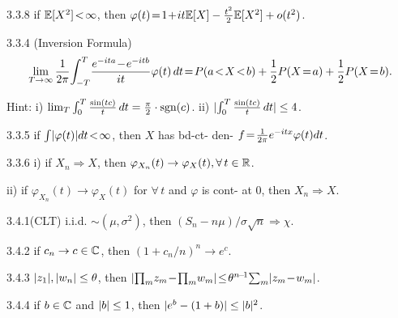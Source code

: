 \vspace{-1ex}

\begin{thm}{3.3.8}
    if $\mathbb{E}[X^2] \!<\! \infty$, then $\varphi(t) \!=\! 1 \!+\! it \mathbb{E}[X] - \frac{t^2}{2} \mathbb{E}[X^2] + o(t^2)$.
\end{thm}

\begin{thm}{3.3.4} (Inversion Formula) 
    \[ \lim_{T \rightarrow \infty} \frac{1}{2\pi} \! \int_{-T}^{T} \! \frac{e^{-ita} \tm e^{-itb}}{it} \varphi(t) \, dt \teq \prob{a \tl X \tl b} + \frac{1}{2} \prob{X \teq a} + \frac{1}{2} \prob{X \teq b}.\]
    
    \vspace{-1ex}
    Hint: i) $\lim_T \int_0^T \frac{\sin(tc)}{t} \, dt = \frac{\pi}{2} \cdot \text{sgn}(c)$. ii) $\lvert \int_0^T \frac{\sin(tc)}{t} \, dt \rvert \leq 4$.
\end{thm}

\begin{thm}{3.3.5}
    if $\int \lvert \varphi(t) \rvert dt \!<\! \infty$, then $X$ has bd-ct- den- $f \!=\! \frac{1}{2\pi} e^{-itx} \varphi(t) dt$.
\end{thm}

\begin{thm}{3.3.6}
    i) if $X_n \Rightarrow X$, then $\varphi_{X_n}(t) \rightarrow \varphi_X(t), \forall\, t\in \mathbb{R}$.
    
    ii) if $\varphi_{X_n}(t) \rightarrow \varphi_X(t)$ for $\forall\, t$ and $\varphi$ is cont- at $0$, then $X_n \Rightarrow X$. 
\end{thm}

\begin{thm}{3.4.1}(CLT)
    i.i.d. $\sim (\mu, \sigma^2)$, then $(S_n - n\mu) / \sigma\sqrt{n} \Rightarrow \chi$.
\end{thm}

\begin{thm}{3.4.2}
     if $c_n \rightarrow c \in \mathbb{C}$, then $(1 + c_n/n)^n \rightarrow e^c$.
\end{thm}

\begin{lem}{3.4.3}
    $\lvert z_1 \rvert, \lvert w_n \rvert \leq \theta$, then $\abs{\prod_m \! z_m \tm \prod_m \! w_m} \tleq \theta^{n \tm 1}\!\sum_m \abs{z_m \tm w_m}$. 
\end{lem}

\begin{lem}{3.4.4}
    if $b \in \mathbb{C}$ and $\lvert b \rvert \leq 1$, then $\lvert e^b - (1+b) \rvert \leq \lvert b \rvert^2$.
\end{lem}

